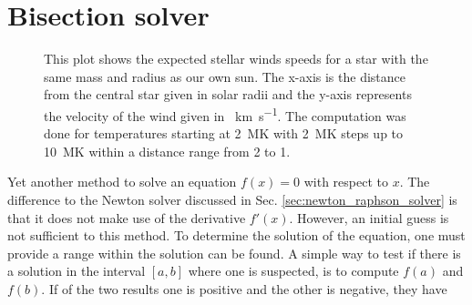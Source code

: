 \documentclass{aa}
\begin{document}
\section{Bisection solver}%
\label{sec:bisection_solver}

\begin{figure}[tbp]
    \caption{This plot shows the expected stellar winds speeds for a star with
    the same mass and radius as our own sun. The x-axis is the distance from the
    central star given in solar radii \SI{}{\Rsol} and the y-axis
    represents the velocity of the wind given in \SI{}{\kilo\meter\per\second}.
    The computation was done for temperatures starting at \SI{2}{\mega\kelvin}
    with \SI{2}{\mega\kelvin} steps up to \SI{10}{\mega\kelvin} within a 
    distance range from \SI{2}{\Rsol} to \SI{1}{\AU}.}
    \label{fig:Parker_results}
\end{figure}
Yet another method to solve an equation \(f(x) = 0\) with respect to \(x\). The
difference to the Newton solver discussed in Sec.
\ref{sec:newton_raphson_solver} is that it does not make use of the derivative
\(f'(x)\). However, an initial guess is not sufficient to this method. To
determine the solution of the equation, one must provide a range within the
solution can be found. A simple way to test if there is a solution in the
interval \([a, b]\) where one is suspected, is to compute \(f(a)\) and \(f(b)\).
If of the two results one is positive and the other is negative, they have
\end{document}
